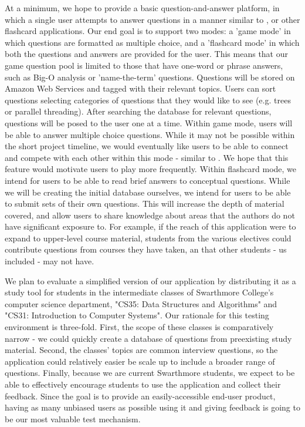 At a minimum, we hope to provide a basic question-and-answer platform, in which a single user attempts to answer questions in a manner similar to \cite{Quizlet}, or other flashcard applications. Our end goal is to support two modes: a 'game mode' in which questions are formatted as multiple choice, and a 'flashcard mode' in which both the questions and answers are provided for the user. This means that our game question pool is limited to those that have one-word or phrase answers, such as Big-O analysis or 'name-the-term' questions. Questions will be stored on Amazon Web Services and tagged with their relevant topics. Users can sort questions selecting categories of questions that they would like to see (e.g. trees or parallel threading). After searching the database for relevant questions, questions will be posed to the user one at a time. Within game mode, users will be able to answer multiple choice questions. While it may not be possible within the short project timeline, we would eventually like users to be able to connect and compete with each other within this mode - similar to \cite{Quizup}. We hope that this feature would motivate users to play more frequently. Within flashcard mode, we intend for users to be able to read brief answers to conceptual questions. While we will be creating the initial database ourselves, we intend for users to be able to submit sets of their own questions. This will increase the depth of material covered, and allow users to share knowledge about areas that the authors do not have significant exposure to. For example, if the reach of this application were to expand to upper-level course material, students from the various electives could contribute questions from courses they have taken, an that other students - us included - may not have.

We plan to evaluate a simplified version of our application by distributing it as a study tool for students in the intermediate classes of Swarthmore College's computer science department, "CS35: Data Structures and Algorithms" and "CS31: Introduction to Computer Systems". Our rationale for this testing environment is three-fold. First, the scope of these classes is comparatively narrow - we could quickly create a database of questions from preexisting study material. Second, the classes' topics are common interview questions, so the application could relatively easier be scale up to include a broader range of questions. Finally, because we are current Swarthmore students, we expect to be able to effectively encourage students to use the application and collect their feedback. Since the goal is to provide an easily-accessible end-user product, having as many unbiased users as possible using it and giving feedback is going to be our most valuable test mechanism.
